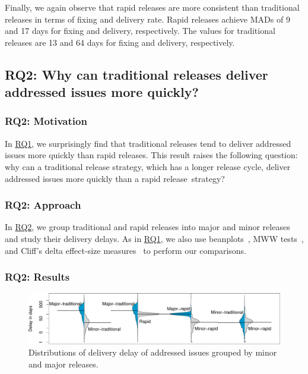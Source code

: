 Finally, we again observe that rapid releases are more consistent than
traditional releases in terms of fixing and delivery rate. Rapid releases
achieve MADs of 9 and 17 days for fixing and delivery, respectively. The values
for traditional releases are 13 and 64 days for fixing and delivery,
respectively.\\ 


\subsection{RQ2: Why can traditional releases deliver addressed issues
more quickly?}\label{ch5:rq2} 

\subsubsection*{RQ2: Motivation} 

In \hyperref[ch5:rq1]{RQ1}, we surprisingly find that traditional releases tend
to deliver addressed issues more quickly than rapid releases. This result raises
the following question: why can a traditional release strategy, which has a
longer release cycle, deliver addressed issues more quickly than a rapid
release~strategy?\\

\subsubsection*{RQ2: Approach}

In \hyperref[ch5:rq2]{RQ2}, we group traditional and rapid releases into major
and minor releases and study their delivery delays. As in
\hyperref[ch5:rq1]{RQ1}, we also use beanplots~\cite{kampstra2008beanplot}, MWW
tests~\cite{wilks2011statistical}, and Cliff's delta effect-size
measures~\cite{cliff1993dominance} to perform our comparisons.

\subsubsection*{RQ2: Results}

\begin{figure}[t!]
	\centering
	\includegraphics[width=\textwidth,keepaspectratio]
	{chapters/chapter5/figures/rq2/major_vs_minor.pdf}
	\caption{
		Distributions of delivery delay of addressed issues grouped by minor and major
		releases.
	}
	\label{fig:major_vs_minor}
\end{figure}

